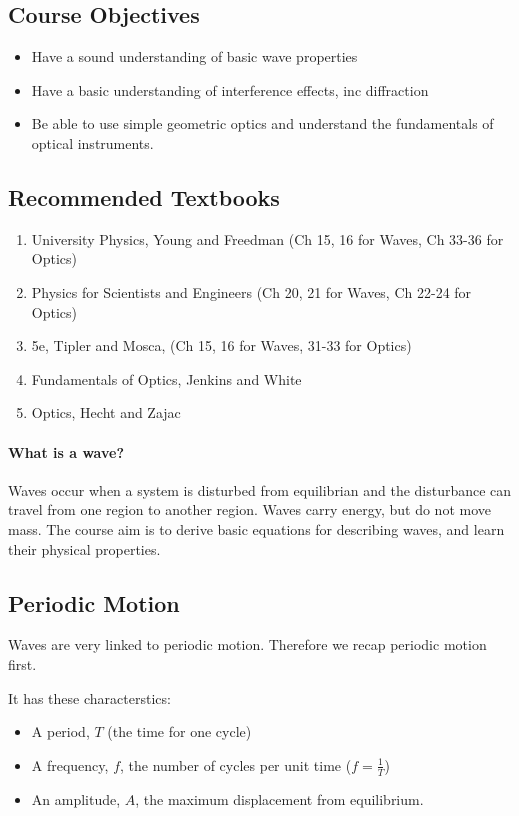 

\subsection*{Course Objectives}
\begin{itemize}
    \item Have a sound understanding of basic wave properties
    \item Have a basic understanding of interference effects, inc diffraction
    \item Be able to use simple geometric optics and understand the fundamentals of optical instruments.
\end{itemize}


\subsection*{Recommended Textbooks}
\begin{enumerate}
    \item University Physics, Young and Freedman (Ch 15, 16 for Waves, Ch 33-36 for Optics)
    \item Physics for Scientists and Engineers (Ch 20, 21 for Waves, Ch 22-24 for Optics)
    \item 5e, Tipler and Mosca, (Ch 15, 16 for Waves, 31-33 for Optics)
    \item Fundamentals of Optics, Jenkins and White
    \item Optics, Hecht and Zajac
\end{enumerate}

\paragraph{What is a wave?} Waves occur when a system is disturbed from equilibrian and the disturbance can travel from one region to another region. Waves carry energy, but do not move mass. The course aim is to derive basic equations for describing waves, and learn their physical properties.

\subsection*{Periodic Motion}
Waves are very linked to periodic motion. Therefore we recap periodic motion first.

It has these characterstics:
\begin{itemize}
    \item A period, $T$ (the time for one cycle)
    \item A frequency, $f$, the number of cycles per unit time ($f = \frac{1}{T}$)
    \item An amplitude, $A$, the maximum displacement from equilibrium.
\end{itemize}

